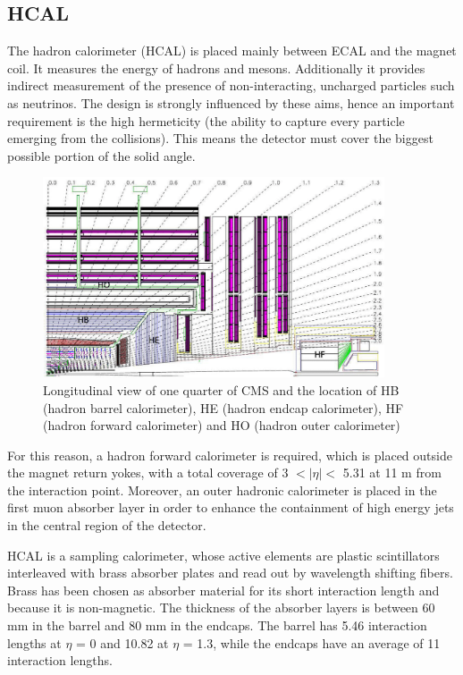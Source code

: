 \subsection{HCAL}

The hadron calorimeter (HCAL) is placed mainly between ECAL and the magnet coil. It measures the energy of hadrons and mesons. Additionally it provides indirect measurement of the presence of non-interacting, uncharged particles such as neutrinos. The design is strongly influenced by these aims, hence an important requirement is the high hermeticity (the ability to capture every particle emerging from the collisions). This means the detector must cover the biggest possible portion of the solid angle.

\begin{figure}[hbtp]
  \begin{center}
    \includegraphics[width=0.9\textwidth]{figure/CH2/HCAL.png}
  \end{center}
  \caption{\label{fig:HCAL}Longitudinal view of one quarter of CMS and the location of HB (hadron barrel calorimeter), HE (hadron endcap calorimeter), HF (hadron forward calorimeter) and HO (hadron outer calorimeter)}
\end{figure}

For this reason, a hadron forward calorimeter is required, which is placed outside the magnet return yokes, with a total coverage of 3 $< |\eta| <$ 5.31 at 11 m from the interaction point. Moreover, an outer hadronic calorimeter is placed in the first muon absorber layer in order to enhance the containment of high energy jets in the central region of the detector.

HCAL is a sampling calorimeter, whose active elements are plastic scintillators interleaved with brass absorber plates and read out by wavelength shifting fibers. Brass has been chosen as absorber material for its short interaction length and because it is non-magnetic. The thickness of the absorber layers is between 60 mm in the barrel and 80 mm in the endcaps. The barrel has 5.46 interaction lengths at $\eta$ = 0 and 10.82 at $\eta$ = 1.3, while the endcaps have an average of 11 interaction lengths\cite{CMS_AN_2006-138}.

